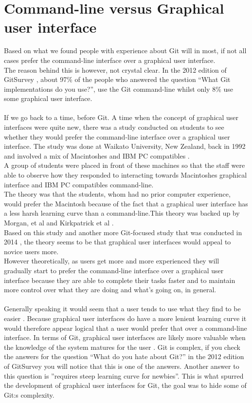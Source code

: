 \documentclass[a4paper,oneside]{bth} %
\begin{document}
			\section{Command-line versus Graphical user interface}
			Based on what we found people with experience about Git will in most, if not all cases prefer the command-line interface over a graphical user interface.\\
			The reason behind this is however, not crystal clear. In the 2012 edition of GitSurvey \cite{GitUserSurvey}, about 97\% of the people who answered the question “What Git implementations do you use?”, use the Git command-line whilst only 8\% use some graphical user interface.\\\\
			If we go back to a time, before Git. A time when the concept of graphical user interfaces were quite new, there was a study conducted on students to see whether they would prefer the command-line interface over a graphical user interface. The study was done at Waikato University, New Zealand, back in 1992 and involved a mix of Macintoshes and IBM PC compatibles \cite{Treweek}.\\
			A group of students were placed in front of these machines so that the staff were able to observe how they responded to interacting towards Macintoshes graphical interface and IBM PC compatibles command-line.\\
			The theory was that the students, whom had no prior computer experience, would prefer the Macintosh because of the fact that a graphical user interface has a less harsh learning curve than a command-line.This theory was backed up by Morgan, et al \cite{MouseToRat} and Kirkpatrick et al \cite{MacVsWindows}.\\
			Based on this study and another more Git-focused study that was conducted in 2014 \cite{GitInClassroom}, the theory seems to be that graphical user interfaces would appeal to novice users more.\\
			However theoretically, as users get more and more experienced they will gradually start to prefer the command-line interface over a graphical user interface because they are able to complete their tasks faster and to maintain more control over what they are doing and what's going on, in general.\\\\
			Generally speaking it would seem that a user tends to use what they find to be easier \cite{Treweek}. Because graphical user interfaces do have a more lenient learning curve it would therefore appear logical that a user would prefer that over a command-line interface. In terms of Git, graphical user interfaces are likely more valuable when the knowledge of the system matures for the user \cite{GitInClassroom}. Git is complex, if you check the answers for the question “What do you hate about Git?” in the 2012 edition of GitSurvey you will notice that this is one of the answers. Another answer to this question is ”requires steep learning curve for newbies”. This is what spurred the development of graphical user interfaces for Git, the goal was to hide some of Git:s complexity. \cite{WrongWithGit}
			
\end{document}
